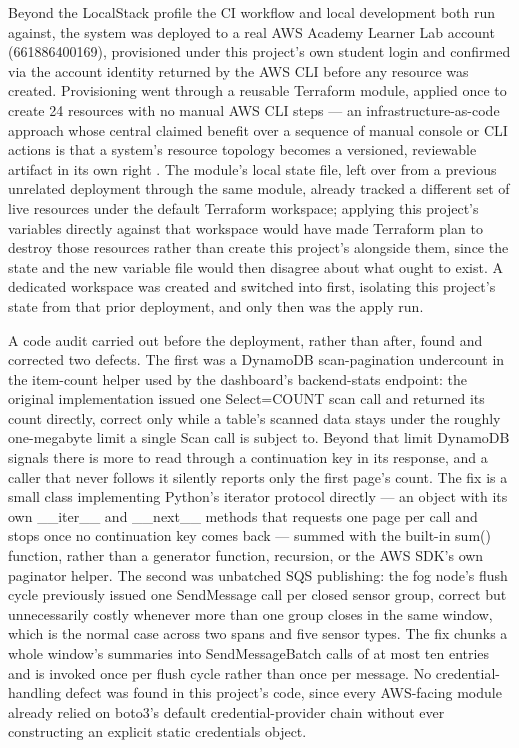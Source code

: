 \documentclass[conference]{IEEEtran}
\begin{document}
Beyond the LocalStack profile the CI workflow and local development both run against, the system was deployed to a real AWS Academy Learner Lab account (661886400169), provisioned under this project's own student login and confirmed via the account identity returned by the AWS CLI before any resource was created. Provisioning went through a reusable Terraform module, applied once to create 24 resources with no manual AWS CLI steps --- an infrastructure-as-code approach whose central claimed benefit over a sequence of manual console or CLI actions is that a system's resource topology becomes a versioned, reviewable artifact in its own right \cite{ref10}. The module's local state file, left over from a previous unrelated deployment through the same module, already tracked a different set of live resources under the default Terraform workspace; applying this project's variables directly against that workspace would have made Terraform plan to destroy those resources rather than create this project's alongside them, since the state and the new variable file would then disagree about what ought to exist. A dedicated workspace was created and switched into first, isolating this project's state from that prior deployment, and only then was the apply run.

A code audit carried out before the deployment, rather than after, found and corrected two defects. The first was a DynamoDB scan-pagination undercount in the item-count helper used by the dashboard's backend-stats endpoint: the original implementation issued one Select=COUNT scan call and returned its count directly, correct only while a table's scanned data stays under the roughly one-megabyte limit a single Scan call is subject to. Beyond that limit DynamoDB signals there is more to read through a continuation key in its response, and a caller that never follows it silently reports only the first page's count. The fix is a small class implementing Python's iterator protocol directly --- an object with its own \_\_iter\_\_ and \_\_next\_\_ methods that requests one page per call and stops once no continuation key comes back --- summed with the built-in sum() function, rather than a generator function, recursion, or the AWS SDK's own paginator helper. The second was unbatched SQS publishing: the fog node's flush cycle previously issued one SendMessage call per closed sensor group, correct but unnecessarily costly whenever more than one group closes in the same window, which is the normal case across two spans and five sensor types. The fix chunks a whole window's summaries into SendMessageBatch calls of at most ten entries and is invoked once per flush cycle rather than once per message. No credential-handling defect was found in this project's code, since every AWS-facing module already relied on boto3's default credential-provider chain without ever constructing an explicit static credentials object.
\end{document}
